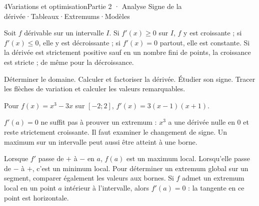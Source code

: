 \begin{ouverture}[derivation]{4}{Variations et optimisation}{Partie 2 · Analyse}
{Signe de la dérivée\enspace·\enspace Tableaux\enspace·\enspace Extremums\enspace·\enspace Modèles}
\end{ouverture}
\essentiel
{}
\begin{theoreme}
Soit $f$ dérivable sur un intervalle $I$.
Si $f'(x)\geq0$ sur $I$, $f$ y est croissante ; si $f'(x)\leq0$, elle y est
décroissante ; si $f'(x)=0$ partout, elle est constante.
Si la dérivée est strictement positive sauf en un nombre fini de points,
la croissance est stricte ; de même pour la décroissance.
\end{theoreme}
\begin{savoirfaire}
Déterminer le domaine. Calculer et factoriser la dérivée. Étudier son signe.
Tracer les flèches de variation et calculer les valeurs remarquables.
\end{savoirfaire}
\begin{exemple}
Pour $f(x)=x^3-3x$ sur $[-2;2]$, $f'(x)=3(x-1)(x+1)$.
\end{exemple}
\begin{center}\begin{tableau}
\end{tableau}\end{center}
\begin{attention}
$f'(a)=0$ ne suffit pas à prouver un extremum : $x^3$ a une dérivée nulle en 0
et reste strictement croissante. Il faut examiner le changement de signe.
Un maximum sur un intervalle peut aussi être atteint à une borne.
\end{attention}
\clearpage
{}
\begin{propriete}
Lorsque $f'$ passe de $+$ à $-$ en $a$, $f(a)$ est un maximum local.
Lorsqu'elle passe de $-$ à $+$, c'est un minimum local. Pour déterminer un
extremum global sur un segment, comparer également les valeurs aux bornes.
Si $f$ admet un extremum local en un point $a$ intérieur à l'intervalle, alors
$f'(a)=0$ : la tangente en ce point est horizontale.
\end{propriete}

